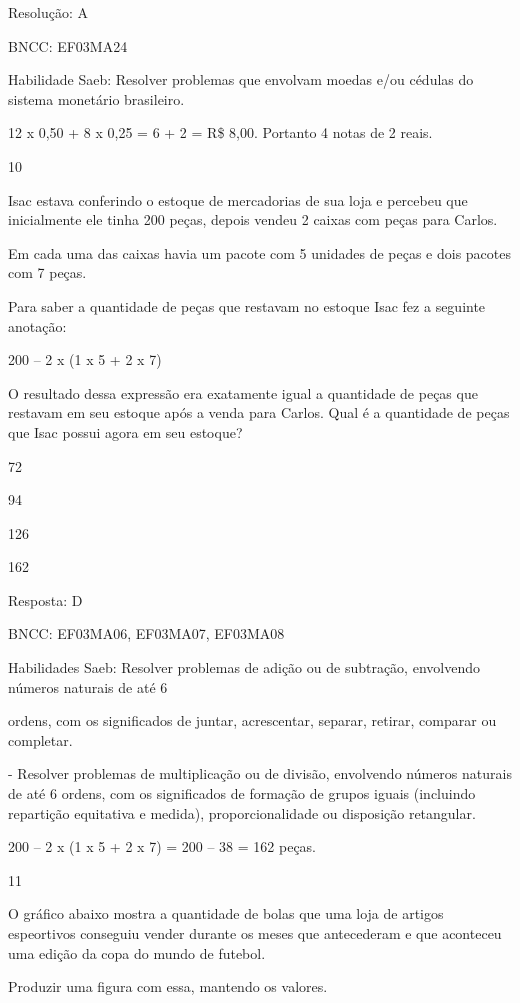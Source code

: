 \begin{escolha}
{\begin{escolha}
{Resolução: A

BNCC: EF03MA24

Habilidade Saeb: Resolver problemas que envolvam moedas e/ou cédulas do
sistema monetário brasileiro.

12 x 0,50 + 8 x 0,25 = 6 + 2 = R\$ 8,00. Portanto 4 notas de 2 reais.

\num{10}

Isac estava conferindo o estoque de mercadorias de sua loja e percebeu
que inicialmente ele tinha 200 peças, depois vendeu 2 caixas com peças
para Carlos.

Em cada uma das caixas havia um pacote com 5 unidades de peças e dois
pacotes com 7 peças.

Para saber a quantidade de peças que restavam no estoque Isac fez a
seguinte anotação:

200 -- 2 x (1 x 5 + 2 x 7)

O resultado dessa expressão era exatamente igual a quantidade de peças
que restavam em seu estoque após a venda para Carlos. Qual é a
quantidade de peças que Isac possui agora em seu estoque?

\begin{escolha}
\item
  72
\item
  94
\item
  126
\item
  162
\end{escolha}

Resposta: D

BNCC: EF03MA06, EF03MA07, EF03MA08

Habilidades Saeb: Resolver problemas de adição ou de subtração,
envolvendo números naturais de até 6

ordens, com os significados de juntar, acrescentar, separar, retirar,
comparar ou completar.

- Resolver problemas de multiplicação ou de divisão, envolvendo números
naturais de até 6 ordens, com os significados de formação de grupos
iguais (incluindo repartição equitativa e medida), proporcionalidade ou
disposição retangular.

200 -- 2 x (1 x 5 + 2 x 7) = 200 -- 38 = 162 peças.

\num{11}

O gráfico abaixo mostra a quantidade de bolas que uma loja de artigos
espeortivos conseguiu vender durante os meses que antecederam e que
aconteceu uma edição da copa do mundo de futebol.

Produzir uma figura com essa, mantendo os valores.

}
\end{escolha}}
\end{escolha}
